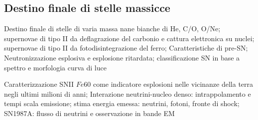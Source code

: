 \subsection{Destino finale di stelle massicce}

\begin{frame}{Destino finale di stelle di varia massa}
nane bianche di He, C/O, O/Ne; supernovae di tipo II da deflagrazione del carbonio e cattura elettronica su nuclei; supernovae di tipo II da fotodisintegrazione del ferro; Caratteristiche di pre-SN; Neutronizzazione esplosiva e esplosione ritardata; classificazione SN in base a spettro e morfologia curva di luce
\end{frame}



\begin{frame}{Caratterizzazione SNII}
$Fe60$ come indicatore esplosioni nelle vicinanze della terra negli ultimi milioni di anni; Interazione neutrini-nucleo denso: intrappolamento e tempi scala emissione; stima energia emessa: neutrini, fotoni, fronte di shock; SN1987A: flusso di neutrini e osservazione in bande EM
\end{frame}

